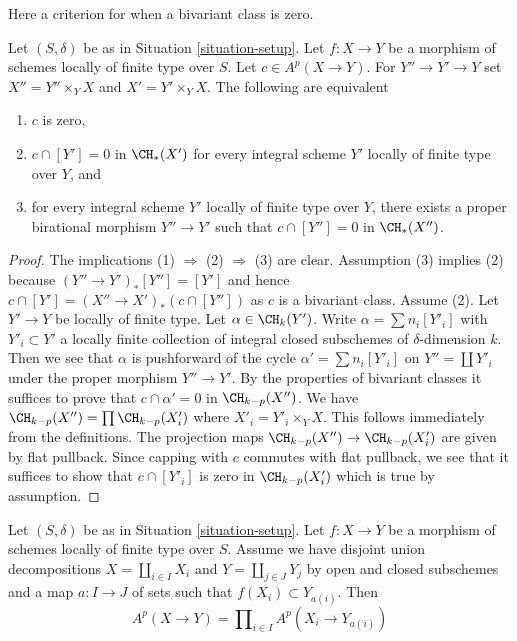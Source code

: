\noindent
Here a criterion for when a bivariant class is zero.

\begin{lemma}
\label{lemma-bivariant-zero}
Let $(S, \delta)$ be as in Situation \ref{situation-setup}.
Let $f : X \to Y$ be a morphism of schemes locally of finite type over $S$.
Let $c \in A^p(X \to Y)$. For $Y'' \to Y' \to Y$ set
$X'' = Y'' \times_Y X$ and $X' = Y' \times_Y X$.
The following are equivalent
\begin{enumerate}
\item $c$ is zero,
\item $c \cap [Y'] = 0$ in $\CH_*(X')$ for every integral scheme $Y'$
locally of finite type over $Y$, and
\item for every integral scheme $Y'$ locally of finite type over $Y$,
there exists a proper birational morphism $Y'' \to Y'$ such that
$c \cap [Y''] = 0$ in $\CH_*(X'')$.
\end{enumerate}
\end{lemma}

\begin{proof}
The implications (1) $\Rightarrow$ (2) $\Rightarrow$ (3) are clear.
Assumption (3) implies (2) because $(Y'' \to Y')_*[Y''] = [Y']$
and hence $c \cap [Y'] = (X'' \to X')_*(c \cap [Y''])$ as $c$
is a bivariant class. Assume (2).
Let $Y' \to Y$ be locally of finite type. Let $\alpha \in \CH_k(Y')$.
Write $\alpha = \sum n_i [Y'_i]$ with $Y'_i \subset Y'$ a locally finite
collection of integral closed subschemes of $\delta$-dimension $k$.
Then we see that $\alpha$ is pushforward of the cycle
$\alpha' = \sum n_i[Y'_i]$ on $Y'' = \coprod Y'_i$ under the
proper morphism $Y'' \to Y'$. By the properties of bivariant
classes it suffices to prove that $c \cap \alpha' = 0$ in $\CH_{k - p}(X'')$.
We have $\CH_{k - p}(X'') = \prod \CH_{k - p}(X'_i)$ where
$X'_i = Y'_i \times_Y X$. This follows immediately
from the definitions. The projection maps
$\CH_{k - p}(X'') \to \CH_{k - p}(X'_i)$ are given by flat pullback.
Since capping with $c$ commutes with
flat pullback, we see that it suffices to show that $c \cap [Y'_i]$
is zero in $\CH_{k - p}(X'_i)$ which is true by assumption.
\end{proof}

\begin{lemma}
\label{lemma-disjoint-decomposition-bivariant}
Let $(S, \delta)$ be as in Situation \ref{situation-setup}.
Let $f : X \to Y$ be a morphism of schemes locally of finite type over $S$.
Assume we have disjoint union decompositions
$X = \coprod_{i \in I} X_i$ and $Y = \coprod_{j \in J} Y_j$
by open and closed subschemes
and a map $a : I \to J$ of sets such that $f(X_i) \subset Y_{a(i)}$.
Then
$$
A^p(X \to Y) = \prod\nolimits_{i \in I} A^p(X_i \to Y_{a(i)})
$$
\end{lemma}

